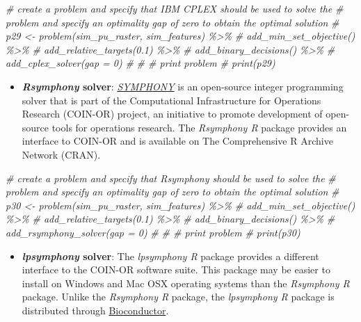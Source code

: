 \documentclass[
  12pt,
]{book}
\newenvironment{Shaded}{\begin{snugshade}}{\end{snugshade}}
\newcommand{\CommentTok}[1]{\textcolor[rgb]{0.56,0.35,0.01}{\textit{#1}}}
\providecommand{\tightlist}{%
  \setlength{\itemsep}{0pt}\setlength{\parskip}{0pt}}
\begin{document}
\begin{Shaded}
\begin{Highlighting}[]
\CommentTok{\# create a problem and specify that IBM CPLEX should be used to solve the}
\CommentTok{\# problem and specify an optimality gap of zero to obtain the optimal solution}
\CommentTok{\# p29 \textless{}{-} problem(sim\_pu\_raster, sim\_features) \%\textgreater{}\%}
\CommentTok{\#        add\_min\_set\_objective() \%\textgreater{}\%}
\CommentTok{\#        add\_relative\_targets(0.1) \%\textgreater{}\%}
\CommentTok{\#        add\_binary\_decisions() \%\textgreater{}\%}
\CommentTok{\#        add\_cplex\_solver(gap = 0)}
\CommentTok{\# }
\CommentTok{\# \# print problem}
\CommentTok{\# print(p29)}
\end{Highlighting}
\end{Shaded}

\begin{itemize}
\tightlist
\item
  \textbf{\emph{Rsymphony} solver}: \href{https://projects.coin-or.org/SYMPHONY}{\emph{SYMPHONY}} is an open-source integer programming solver that is part of the Computational Infrastructure for Operations Research (COIN-OR) project, an initiative to promote development of open-source tools for operations research. The \emph{Rsymphony R} package provides an interface to COIN-OR and is available on The Comprehensive R Archive Network (CRAN).
\end{itemize}

\begin{Shaded}
\begin{Highlighting}[]
\CommentTok{\# create a problem and specify that Rsymphony should be used to solve the}
\CommentTok{\# problem and specify an optimality gap of zero to obtain the optimal solution}
\CommentTok{\# p30 \textless{}{-} problem(sim\_pu\_raster, sim\_features) \%\textgreater{}\%}
\CommentTok{\#        add\_min\_set\_objective() \%\textgreater{}\%}
\CommentTok{\#        add\_relative\_targets(0.1) \%\textgreater{}\%}
\CommentTok{\#        add\_binary\_decisions() \%\textgreater{}\%}
\CommentTok{\#        add\_rsymphony\_solver(gap = 0)}
\CommentTok{\# }
\CommentTok{\# \# print problem}
\CommentTok{\# print(p30)}
\end{Highlighting}
\end{Shaded}

\begin{itemize}
\tightlist
\item
  \textbf{\emph{lpsymphony} solver}: The \emph{lpsymphony R} package provides a different interface to the COIN-OR software suite. This package may be easier to install on Windows and Mac OSX operating systems than the \emph{Rsymphony R} package. Unlike the \emph{Rsymphony R} package, the \emph{lpsymphony R} package is distributed through \href{http://bioconductor.org/packages/release/bioc/html/lpsymphony.html}{Bioconductor}.
\end{itemize}
\end{document}

